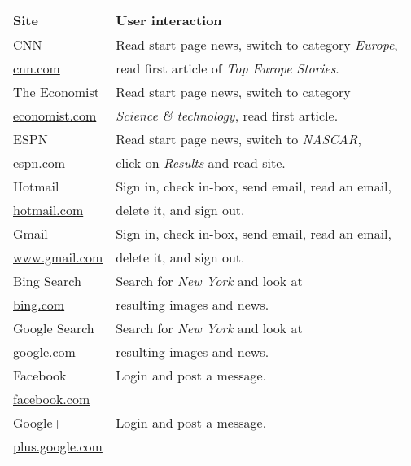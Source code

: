 \begin{table}
	\small
	\centering
	\begin{tabular}{l l}
		\toprule
		\textbf{Site} & \textbf{User interaction} \\ \midrule

		CNN 					& Read start page news, switch to category \textit{Europe}, 			\\ 
		\url{cnn.com} 			& read first article of \textit{Top Europe Stories}. 					\\ \midrule

		The Economist 			& Read start page news, switch to category 								\\ 
		\url{economist.com}		& \textit{Science \& technology}, read first article. 					\\ \midrule

		ESPN 					& Read start page news, switch to \textit{NASCAR}, 		 				\\ 
		\url{espn.com} 			& click on \textit{Results} and read site. 								\\ \midrule

		Hotmail 				& Sign in, check in-box, send email, read an email,						\\ 
		\url{hotmail.com} 		& delete it, and sign out. 												\\ \midrule

		Gmail 					& Sign in, check in-box, send email, read an email, 						\\ 
		\url{www.gmail.com} 	& delete it, and sign out. 												\\ \midrule

		Bing Search 			& Search for \textit{New York} and look at 								\\ 
		\url{bing.com} 			& resulting images and news. 											\\ \midrule

		Google Search 			& Search for \textit{New York} and look at 								\\ 
		\url{google.com}		& resulting images and news. 											\\ \midrule

		Facebook 				& Login and post a message. 											\\ 
		\url{facebook.com} 		&  																		\\ \midrule

		Google+ 				& Login and post a message. 											\\ 
		\url{plus.google.com} 	& 																		\\ \midrule


\end{tabular}
\end{table}
